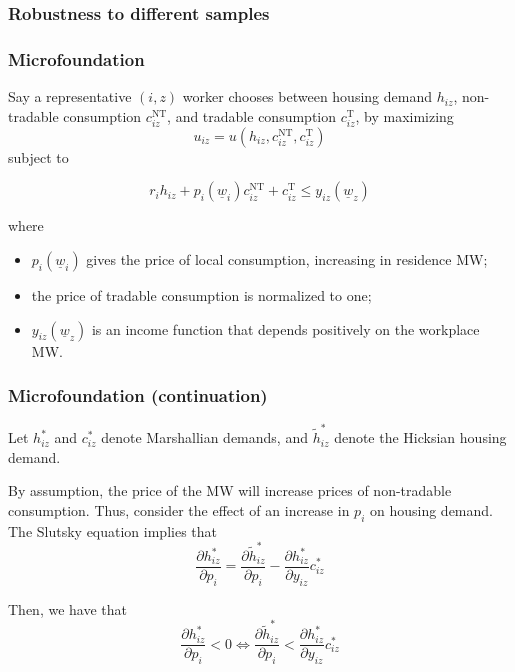 \documentclass[aspectratio=169, t]{beamer}
\newcommand{\MW}{\underline{w}}
\begin{document}
\begin{frame}[label = robustness_sample]
	\frametitle{Robustness to different samples}
	
	
	
	\hyperlink{robus_sample}{}
\end{frame}

\begin{frame}[label = microfound]
	\frametitle{Microfoundation}
	Say a representative $(i,z)$ worker chooses between housing demand $h_{iz}$,
	non-tradable consumption $c^{\text{NT}}_{iz}$, and tradable consumption $c^{\text{T}}_{iz}$,
	by maximizing
	\[
	u_{iz} = u \left(h_{iz}, c^{\text{NT}}_{iz}, c^{\text{T}}_{iz}\right)
	\]
	subject to

	\[
	r_i h_{iz} + p_i(\MW_i) c^{\text{NT}}_{iz} + c^{\text{T}}_{iz} \leq y_{iz}(\MW_z)
	\]

	where 
	\begin{itemize}
		\item $p_i(\MW_i)$ gives the price of local consumption, increasing in residence MW;
		\item the price of tradable consumption is normalized to one;  
		\item $y_{iz}(\MW_z)$ is an income function that depends positively on the workplace MW.
	\end{itemize}
\end{frame}

\begin{frame}
	\frametitle{Microfoundation (continuation)}

	Let $h_{iz}^*$ and $c_{iz}^*$ denote Marshallian demands, and 
	$\tilde h_{iz}^*$ denote the Hicksian housing demand.

	\vspace{2mm}

	By assumption, the price of the MW will increase prices of non-tradable consumption.
	Thus, consider the effect of an increase in $p_i$ on housing demand.
	The Slutsky equation implies that
	\[
	\frac{\partial h_{iz}^*}{\partial p_i} 
	= \frac{\partial \tilde h_{iz}^*}{\partial p_i} 
	- \frac{\partial h_{iz}^*}{\partial y_{iz}} c_{iz}^*
	\]

	Then, we have that 
	\[
	\frac{\partial h_{iz}^*}{\partial p_i} < 0 \iff 
	\frac{\partial \tilde h_{iz}^*}{\partial p_i} 
	< \frac{\partial h_{iz}^*}{\partial y_{iz}} c_{iz}^*
	\]

	\hyperlink{discuss4}{}
\end{frame}
\end{document}
